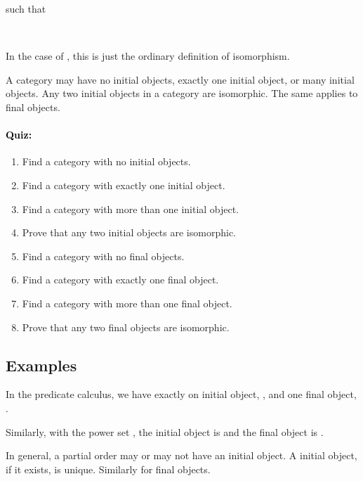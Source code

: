 \documentclass{seminar}
\newcommand{\vs}{\vspace{0.3in}}
\begin{document}
\begin{slide}
such that

\begin{codenott}
\\
\end{codenott}

\vs

In the case of , this is just the ordinary definition of
isomorphism.

\vs

A category may have no initial objects, exactly one initial object,
or many
initial objects.  Any two initial objects in a category are isomorphic.
The same applies to final objects.

\newslide

\paragraph{\textcolor{black}{Quiz:}}

\color{QuoteColor}
\begin{enumerate}
\item Find a category with no initial objects.
\item Find a category with exactly one initial object.
\item Find a category with more than one initial object.
\item Prove that any two initial objects are isomorphic.
\item Find a category with no final objects.
\item Find a category with exactly one final object.
\item Find a category with more than one final object.
\item Prove that any two final objects are isomorphic.
\end{enumerate}
\color{black}


\newslide

\subsection*{Examples}

In the predicate calculus, we have exactly on initial object,
,
and one final object, .

Similarly, with the power set , the initial object
is
\tm{\emptyset} and the final object is .

In general, a partial order may or may not have an initial object.
A initial
object, if it exists, is unique.  Similarly for final objects.


\end{slide}
\end{document}
